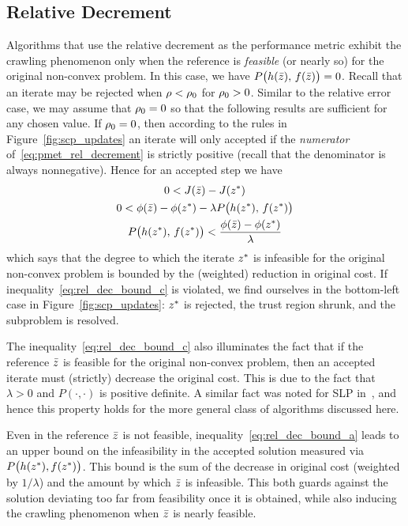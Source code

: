 \documentclass[letterpaper, 10 pt, conference]{ieeeconf}
\begin{document}
\subsection{Relative Decrement}\label{subsec:crepp_rel_dec}

Algorithms that use the relative decrement as the performance metric exhibit the crawling phenomenon only when the reference is \textit{feasible} (or nearly so) for the original non-convex problem. In this case, we have $P\big(h(\bar{z}),\,f(\bar{z})\big)=0$. Recall that an iterate may be rejected when $\rho<\rho_0$ for $\rho_0>0$. Similar to the relative error case, we may assume that $\rho_0=0$ so that the following results are sufficient for any chosen value. If $\rho_0=0$, then according to the rules in Figure~\ref{fig:scp_updates} an iterate will only accepted if the \textit{numerator} of~\eqref{eq:pmet_rel_decrement} is strictly positive (recall that the denominator is always nonnegative). Hence for an accepted step we have
\begin{subequations}\label{eq:rel_dec_bound}
\begin{gather}
0 < J(\bar{z}) - J(z^*) \label{eq:rel_dec_bound_a}\\
0 < \phi(\bar{z}) - \phi(z^*) - \lambda P\big( h(z^*),\,f(z^*) \big) \label{eq:rel_dec_bound_b}\\
 P\big( h(z^*),\,f(z^*) \big) < \frac{\phi(\bar{z}) - \phi(z^*)}{\lambda} \label{eq:rel_dec_bound_c}
\end{gather}
\end{subequations}
which says that the degree to which the iterate $z^*$ is infeasible for the original non-convex problem is bounded by the (weighted) reduction in original cost. If inequality~\eqref{eq:rel_dec_bound_c} is violated, we find ourselves in the bottom-left case in Figure~\ref{fig:scp_updates}: $z^*$ is rejected, the trust region shrunk, and the subproblem is resolved. 

\begin{remark}
The inequality~\eqref{eq:rel_dec_bound_c} also illuminates the fact that if the reference $\bar{z}$ is feasible for the original non-convex problem, then an accepted iterate must (strictly) decrease the original cost. This is due to the fact that $\lambda>0$ and $P(\cdot,\cdot)$ is positive definite. A similar fact was noted for SLP in~\cite{Palacios-Gomez1982}, and hence this property holds for the more general class of algorithms discussed here.
\end{remark}
%
\begin{remark}
Even in the reference $\bar{z}$ is not feasible, inequality~\eqref{eq:rel_dec_bound_a} leads to an upper bound on the infeasibility in the accepted solution measured via $P\big(h(z^*),f(z^*)\big)$. This bound is the sum of the decrease in original cost (weighted by $1/\lambda$) and the amount by which $\bar{z}$ is infeasible. This both guards against the solution deviating too far from feasibility once it is obtained, while also inducing the crawling phenomenon when $\bar{z}$ is nearly feasible. 
\end{remark}
\end{document}
